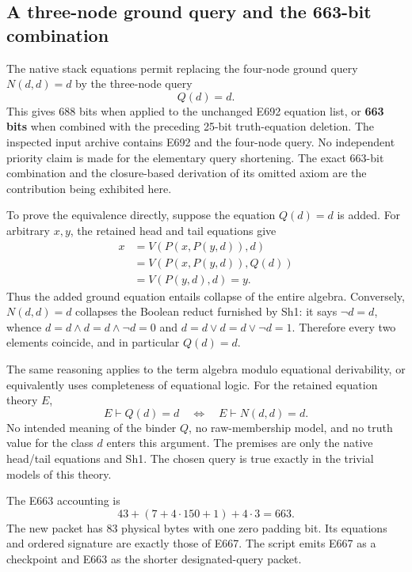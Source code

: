 \subsection{A three-node ground query and the 663-bit combination}
\label{sec:e663}

The native stack equations permit replacing the four-node ground query
\(N(d,d)=d\) by the three-node query
\begin{equation}
                              Q(d)=d.
\label{eq:e663-query}
\end{equation}
This gives 688 bits when applied to the unchanged E692 equation list, or
\textbf{663 bits} when combined with the preceding 25-bit truth-equation
deletion.  The inspected input archive contains E692 and the four-node
query.  No independent priority claim is made for the elementary query
shortening.  The
exact 663-bit combination and the closure-based derivation of its omitted
axiom are the contribution being exhibited here.

To prove the equivalence directly, suppose the equation \(Q(d)=d\) is
added.  For arbitrary \(x,y\), the retained head and tail equations give
\begin{align*}
 x&=V(P(x,P(y,d)),d)\\
  &=V(P(x,P(y,d)),Q(d))\\
  &=V(P(y,d),d)=y.
\end{align*}
Thus the added ground equation entails collapse of the entire algebra.
Conversely, \(N(d,d)=d\) collapses the Boolean reduct furnished by Sh1:
it says \(\neg d=d\), whence
\(d=d\wedge d=d\wedge\neg d=0\) and
\(d=d\vee d=d\vee\neg d=1\).  Therefore every two elements coincide,
and in particular \(Q(d)=d\).

The same reasoning applies to the term algebra modulo equational
derivability, or equivalently uses completeness of equational logic.  For
the retained equation theory \(E\),
\[
 E\vdash Q(d)=d
 \quad\Longleftrightarrow\quad
 E\vdash N(d,d)=d.
\]
No intended meaning of the binder \(Q\), no raw-membership model, and no
truth value for the class \(d\) enters this argument.  The premises are
only the native head/tail equations and Sh1.  The chosen query is true
exactly in the trivial models of this theory.

The E663 accounting is
\[
               43+(7+4\cdot150+1)+4\cdot3=663.
\]
The new packet has 83 physical bytes with one zero padding bit.  Its
equations and ordered signature are exactly those of E667.  The script
emits E667 as a checkpoint and E663 as the shorter designated-query packet.
